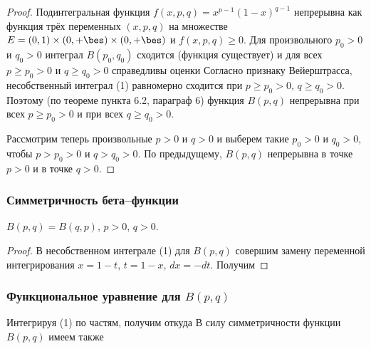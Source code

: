 \documentclass[a4paper]{article}
\begin{document}
\begin{proof}
Подинтегральная функция $f(x,p,q) = x^{p-1} (1-x)^{q-1}$ непрерывна
как функция трёх переменных $(x,p,q)$ на множестве $E=(0,1)\times
(0,+\bes) \times (0,+\bes)$ и $f(x,p,q)\ge0$. Для произвольного
$p_0>0$ и $q_0>0$ интеграл $B(p_0,q_0)$ сходится (функция
существует) и для всех $p\ge p_0 > 0$ и $q\ge q_0 > 0$ справедливы
оценки  Согласно признаку Вейерштрасса, несобственный интеграл
(1) равномерно сходится при $p\ge p_0>0$, $q\ge q_0>0$. Поэтому (по
теореме пункта 6.2, параграф 6) функция $B(p,q)$ непрерывна при всех
$p\ge p_0 > 0$ и при всех $q\ge q_0 > 0$.

Рассмотрим теперь произвольные $p>0$ и $q>0$ и выберем такие $p_0>0$
и $q_0>0$, чтобы $p>p_0>0$ и $q>q_0>0$. По предыдущему, $B(p,q)$
непрерывна в точке $p>0$ и в точке $q>0$.
\end{proof}

\subsubsection{Симметричность бета--функции}

\begin{theorem}
$B(p,q)=B(q,p)$, $p>0$, $q>0$.
\end{theorem}

\begin{proof}
В несобственном интеграле (1) для $B(p,q)$ совершим замену
переменной интегрирования $x=1-t$, $t=1-x$, $dx=-dt$. Получим
\end{proof}

\subsubsection{Функциональное уравнение для $B(p,q)$}

Интегрируя (1) по частям, получим  откуда
 В силу
симметричности функции $B(p,q)$ имеем также 
\end{document}
